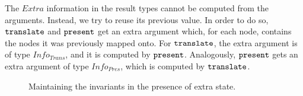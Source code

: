 The $Extra$ information in the result types cannot be computed from the arguments. Instead, we try to reuse its previous value. In order to do so, ${\tt translate}$ and ${\tt present}$ get an extra argument which, for each node, contains the nodes it was previously mapped onto. For ${\tt translate}$, the extra argument is of type $Info_{Trans}$, and it is computed by ${\tt present}$. Analogously, ${\tt present}$ gets an extra argument of type $Info_{Pres}$, which is computed by ${\tt translate}$. 


\begin{figure}
\begin{center}
\begin{center}
\end{center}
\caption{Maintaining the invariants in the presence of extra state.}\label{layerExtraState} 
\end{center}
\end{figure}


